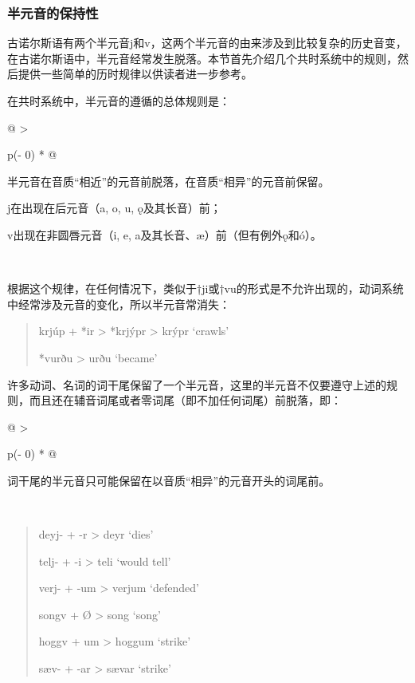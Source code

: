 \subsubsection{半元音的保持性}\label{ux534aux5143ux97f3ux7684ux4fddux6301ux6027}

古诺尔斯语有两个半元音j和v，这两个半元音的由来涉及到比较复杂的历史音变，在古诺尔斯语中，半元音经常发生脱落。本节首先介绍几个共时系统中的规则，然后提供一些简单的历时规律以供读者进一步参考。

在共时系统中，半元音的遵循的总体规则是：

\begin{longtable}[]{@{}
  >{\raggedright\arraybackslash}p{(\columnwidth - 0\tabcolsep) * }@{}}
  \toprule\noalign{}
  \begin{minipage}[b]{\linewidth}\raggedright
    半元音在音质``相近''的元音前脱落，在音质``相异''的元音前保留。

    j在出现在后元音（a, o, u, ǫ及其长音）前；

    v出现在非圆唇元音（i, e, a及其长音、æ）前（但有例外ǫ和ó）。
  \end{minipage} \\
  \midrule\noalign{}
  \endhead
  \bottomrule\noalign{}
  \endlastfoot
\end{longtable}

根据这个规律，在任何情况下，类似于†ji或†vu的形式是不允许出现的，动词系统中经常涉及元音的变化，所以半元音常消失：

\begin{quote}
  krjúp + *ir \textgreater{} *krjýpr \textgreater{} krýpr `crawls'

  *vurðu \textgreater{} urðu `became'
\end{quote}

许多动词、名词的词干尾保留了一个半元音，这里的半元音不仅要遵守上述的规则，而且还在辅音词尾或者零词尾（即不加任何词尾）前脱落，即：

\begin{longtable}[]{@{}
  >{\raggedright\arraybackslash}p{(\columnwidth - 0\tabcolsep) * }@{}}
  \toprule\noalign{}
  \begin{minipage}[b]{\linewidth}\raggedright
    词干尾的半元音只可能保留在以音质``相异''的元音开头的词尾前。
  \end{minipage} \\
  \midrule\noalign{}
  \endhead
  \bottomrule\noalign{}
  \endlastfoot
\end{longtable}

\begin{quote}
  deyj- + -r \textgreater{} deyr `dies'

  telj- + -i \textgreater{} teli `would tell'

  verj- + -um \textgreater{} verjum `defended'

  songv + Ø \textgreater{} song `song'

  hoggv + um \textgreater{} hoggum `strike'

  sæv- + -ar \textgreater{} sævar `strike'
\end{quote}

